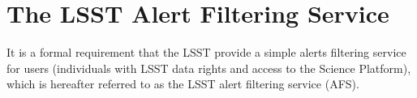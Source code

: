 \documentclass[DM,authoryear,toc]{lsstdoc}
\begin{document}


% 
% 



\section{The LSST Alert Filtering Service} \label{sec:LAFS}

It is a formal requirement that the LSST provide a simple alerts filtering service for users (individuals with LSST data rights and access to the Science Platform), which is hereafter referred to as the LSST alert filtering service (AFS).
\end{document}
